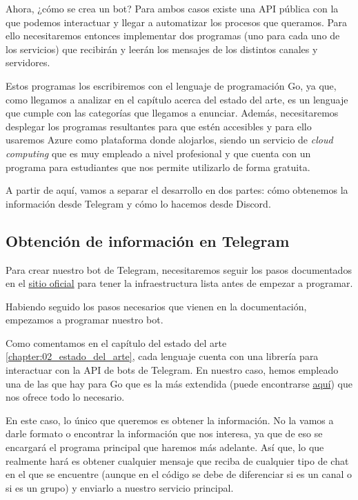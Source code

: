 Ahora, ¿cómo se crea un bot? Para ambos casos existe una API pública con la que 
podemos interactuar y llegar a automatizar los procesos que queramos. Para ello 
necesitaremos entonces implementar dos programas (uno para cada uno de los 
servicios) que recibirán y leerán los mensajes de los distintos canales y 
servidores.

Estos programas los escribiremos con el lenguaje de programación Go, ya que, como 
llegamos a analizar en el capítulo acerca del estado del arte, es un lenguaje que 
cumple con las categorías que llegamos a enunciar. Además, necesitaremos desplegar 
los programas resultantes para que estén accesibles y para ello usaremos Azure 
como plataforma donde alojarlos, siendo un servicio de \textit{cloud computing} 
que es muy empleado a nivel profesional y que cuenta con un programa para 
estudiantes que nos permite utilizarlo de forma gratuita.

A partir de aquí, vamos a separar el desarrollo en dos partes: cómo obtenemos la 
información desde Telegram y cómo lo hacemos desde Discord.

\subsection{Obtención de información en Telegram}

Para crear nuestro bot de Telegram, necesitaremos seguir los pasos documentados en 
el \href{https://core.telegram.org/bots#how-do-i-create-a-bot}{sitio oficial} para 
tener la infraestructura lista antes de empezar a programar.

Habiendo seguido los pasos necesarios que vienen en la documentación, empezamos a 
programar nuestro bot.

Como comentamos en el capítulo del estado del arte \ref{chapter:02_estado_del_arte}, 
cada lenguaje cuenta con una librería para interactuar con la API de bots de 
Telegram. En nuestro caso, hemos empleado una de las que hay para Go que es la más 
extendida (puede encontrarse 
\href{https://pkg.go.dev/github.com/go-telegram-bot-api/telegram-bot-api/v5}{aquí}) 
que nos ofrece todo lo necesario.

En este caso, lo único que queremos es obtener la información. No la vamos a darle 
formato o encontrar la información que nos interesa, ya que de eso se encargará el 
programa principal que haremos más adelante. Así que, lo que realmente hará es 
obtener cualquier mensaje que reciba de cualquier tipo de chat en el que se 
encuentre (aunque en el código se debe de diferenciar si es un canal o si es un 
grupo) y enviarlo a nuestro servicio principal.

